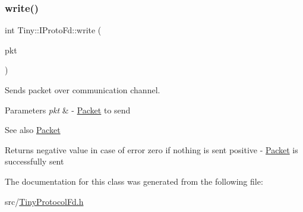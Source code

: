 \subsubsection{\texorpdfstring{write()}{write()}\hspace{0.1cm}{\footnotesize\ttfamily [2/2]}}
{\footnotesize\ttfamily int Tiny\+::\+I\+Proto\+Fd\+::write (\begin{DoxyParamCaption}\item[{\hyperlink{classTiny_1_1IPacket}{I\+Packet} \&}]{pkt }\end{DoxyParamCaption})}

Sends packet over communication channel. 
\begin{DoxyParams}{Parameters}
{\em pkt} & -\/ \hyperlink{classTiny_1_1Packet}{Packet} to send \\
\hline
\end{DoxyParams}
\begin{DoxySeeAlso}{See also}
\hyperlink{classTiny_1_1Packet}{Packet} 
\end{DoxySeeAlso}
\begin{DoxyReturn}{Returns}
negative value in case of error zero if nothing is sent positive -\/ \hyperlink{classTiny_1_1Packet}{Packet} is successfully sent 
\end{DoxyReturn}


The documentation for this class was generated from the following file\+:\begin{DoxyCompactItemize}
\item 
src/\hyperlink{TinyProtocolFd_8h}{Tiny\+Protocol\+Fd.\+h}\end{DoxyCompactItemize}

